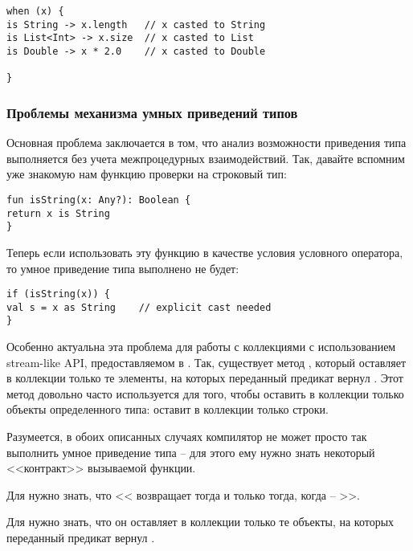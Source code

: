 \begin{verbatim}
when (x) {
is String -> x.length   // x casted to String
is List<Int> -> x.size  // x casted to List
is Double -> x * 2.0    // x casted to Double

}
\end{verbatim}




\subsubsection{Проблемы механизма умных приведений типов}

Основная проблема заключается в том, что анализ возможности приведения типа выполняется без учета межпроцедурных взаимодействий. Так, давайте вспомним уже знакомую нам функцию проверки на строковый тип:

\begin{verbatim}
fun isString(x: Any?): Boolean {
return x is String
}
\end{verbatim}

Теперь если использовать эту функцию в качестве условия условного оператора, то умное приведение типа выполнено не будет:

\begin{verbatim}
if (isString(x)) {
val s = x as String    // explicit cast needed
}
\end{verbatim}

Особенно актуальна эта проблема для работы с коллекциями с использованием stream-like API, предоставляемом в . Так, существует метод , который оставляет в коллекции только те элементы, на которых переданный предикат вернул . Этот метод довольно часто используется для того, чтобы оставить в коллекции только объекты определенного типа:  оставит в коллекции  только строки.

Разумеется, в обоих описанных случаях компилятор не может просто так выполнить умное приведение типа -- для этого ему нужно знать некоторый <<контракт>> вызываемой функции. 

Для  нужно знать, что << возвращает  тогда и только тогда, когда  -- >>. 

Для  нужно знать, что он оставляет в коллекции только те объекты, на которых переданный предикат вернул .


\bigskip

